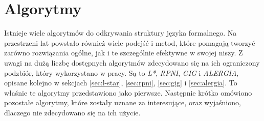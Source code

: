 \chapter{Algorytmy}
\label{cha:algorytmy}

Istnieje wiele algorytmów do odkrywania struktury języka formalnego. Na przestrzeni lat powstało również wiele podejść i metod, które pomagają tworzyć zarówno rozwiązania ogólne, jak i te szczególnie efektywne w swojej niszy. Z uwagi na dużą liczbę dostępnych algorytmów zdecydowano się na ich ograniczony podzbiór, który wykorzystano w pracy. Są to \textit{L*}, \textit{RPNI}, \textit{GIG} i \textit{ALERGIA}, opisane kolejno w sekcjach \ref{sec:l-star}, \ref{sec:rpni}, \ref{sec:gig} i \ref{sec:alergia}. To właśnie te algorytmy przedstawiono jako pierwsze. Następnie krótko omówiono pozostałe algorytmy, które zostały uznane za interesujące, oraz wyjaśniono, dlaczego nie zdecydowano się na ich użycie.






